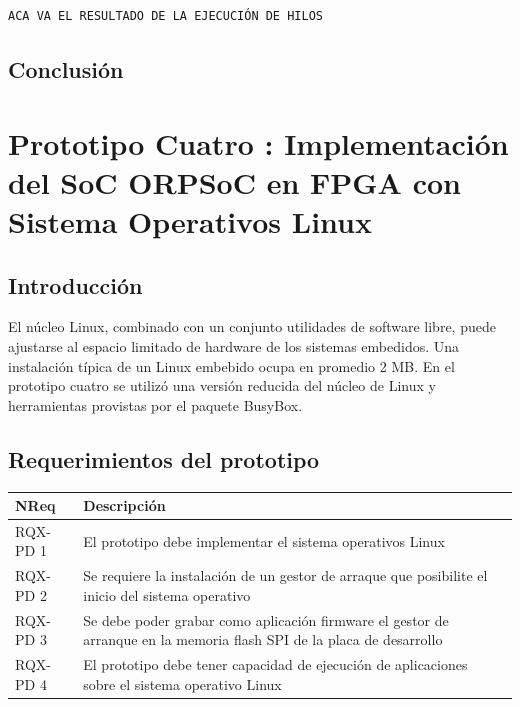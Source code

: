 \newpage

\begin{lstlisting}[frame=single,caption={Salida de la ejecución del programa de prueba twothreads},label={lst:salhilos}]
 ACA VA EL RESULTADO DE LA EJECUCIÓN DE HILOS
\end{lstlisting}



		\section{Conclusión}


\newpage
\chapter{Prototipo Cuatro : Implementación del SoC ORPSoC en FPGA con Sistema Operativos Linux}
		\section{Introducción}
		El núcleo Linux, combinado con un conjunto utilidades de software libre, puede ajustarse al espacio limitado de hardware 
	    de los sistemas embedidos. Una instalación típica de un Linux embebido ocupa en promedio 2 MB. En el prototipo cuatro se utilizó una versión
	    reducida del núcleo de Linux y herramientas provistas por el paquete BusyBox. 
		
		\section{Requerimientos del prototipo}
		
		\begin{table}[h!]
		\centering	
		\begin{tabular}{ p{2.5cm} p{8cm} p{3cm} }
		\hline 
		\rowcolor[gray]{0.8} N\textordmasculine Req  & Descripción\\
		\hline                             	RQX-PD 1 & El prototipo debe implementar el sistema operativos Linux\\ 
		\hline  							RQX-PD 2 & Se requiere la instalación de un gestor de arraque que posibilite el inicio del sistema operativo\\ 
		\hline 								RQX-PD 3 & Se debe poder grabar como aplicación firmware el gestor de arranque en la memoria flash SPI de la placa de desarrollo\\
		\hline 								RQX-PD 4 & El prototipo debe tener capacidad de ejecución de aplicaciones sobre el sistema operativo Linux\\
		\hline 
		\end{tabular}
		\end{table}
		
